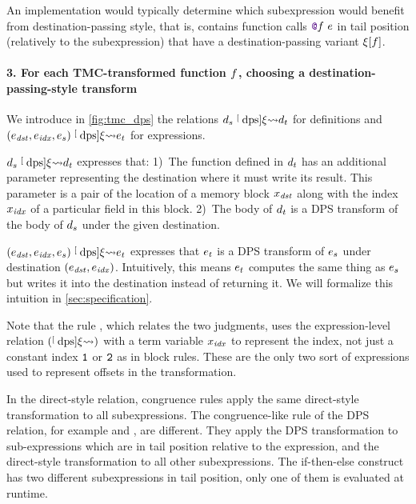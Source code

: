 An implementation would typically determine which subexpression would benefit from destina\-tion-passing style, that is, contains function calls $\datalangCall {\datalangFnptr \datalangFn} \datalangExpr$ in tail position (relatively to the subexpression) that have a destination-passing variant $\datalangRenaming [\datalangFn]$.


\paragraph{3. For each TMC-transformed function $\datalangFn$, choosing a destination-passing-style transform}
We introduce in \cref{fig:tmc_dps} the relations $\datalangDef_s \tmcDps{\datalangRenaming} \datalangDef_t$ for definitions and $(\datalangExpr_\mathit{dst}, \datalangExpr_\mathit{idx}, \datalangExpr_s) \tmcDps{\datalangRenaming} \datalangExpr_t$ for expressions.

$\datalangDef_s \tmcDps{\datalangRenaming} \datalangDef_t$ expresses that:
1)~The function defined in $\datalangDef_t$ has an additional parameter representing the destination where it must write its result. This parameter is a pair of the location of a memory block $\datalangVar_\mathit{dst}$ along with the index $\datalangVar_\mathit{idx}$ of a particular field in this block.
2)~The body of $\datalangDef_t$ is a DPS transform of the body of $\datalangDef_s$ under the given destination.

$(\datalangExpr_\mathit{dst}, \datalangExpr_\mathit{idx}, \datalangExpr_s) \tmcDps{\datalangRenaming} \datalangExpr_t$ expresses that $\datalangExpr_t$ is a DPS transform of $\datalangExpr_s$ under destination $(\datalangExpr_\mathit{dst}, \datalangExpr_\mathit{idx})$.
Intuitively, this means $\datalangExpr_t$ computes the same thing as $\datalangExpr_s$ but writes it into the destination instead of returning it.
We will formalize this intuition in \cref{sec:specification}.

Note that the rule , which relates the two judgments, uses the expression-level relation $(\mathrel{\stackrel[\scriptscriptstyle\textrm{dps}]{ \xi }{ \rightsquigarrow }})$ with a term variable $\datalangVar_\mathit{idx}$ to represent the index, not just a constant index $\texttt{1}$ or $\texttt{2}$ as in block rules. These are the only two sort of expressions used to represent offsets in the transformation.

In the direct-style relation, congruence rules apply the same direct-style transformation to all subexpressions. The congruence-like rule of the DPS relation, for example  and , are different. They apply the DPS transformation to sub-expressions which are in tail position relative to the expression, and the direct-style transformation to all other subexpressions. The if-then-else construct has two different subexpressions in tail position, only one of them is evaluated at runtime.

